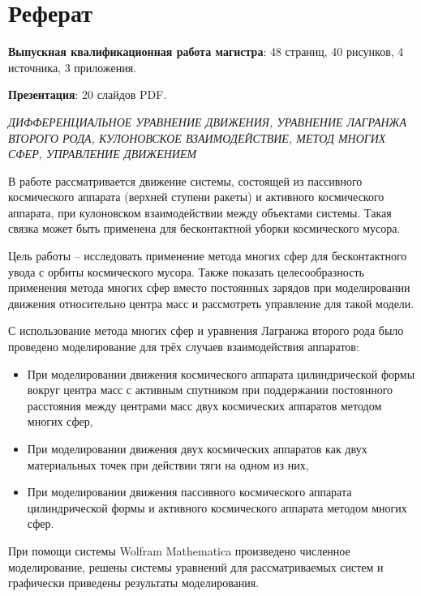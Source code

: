 \section*{Реферат}
\textbf{Выпускная квалификационная работа магистра}: 48 страниц, 40 рисунков, 4 источника, 3 приложения. 

\textbf{Презентация}: 20 слайдов PDF.

\hspace{1pt}

\textit{ДИФФЕРЕНЦИАЛЬНОЕ УРАВНЕНИЕ ДВИЖЕНИЯ, УРАВНЕНИЕ ЛАГРАНЖА ВТОРОГО РОДА, КУЛОНОВСКОЕ ВЗАИМОДЕЙСТВИЕ, МЕТОД МНОГИХ СФЕР, УПРАВЛЕНИЕ ДВИЖЕНИЕМ}

\hspace{1pt}

В работе рассматривается движение системы, состоящей из пассивного космического аппарата (верхней ступени ракеты) и активного космического аппарата, при кулоновском взаимодействии между объектами системы.
Такая связка может быть применена для бесконтактной уборки космического мусора.

Цель работы – исследовать применение метода многих сфер  для бесконтактного увода с орбиты космического мусора.
Также показать целесообразность применения метода многих сфер вместо постоянных зарядов при моделировании движения относительно центра масс и рассмотреть управление для такой модели.

С использование метода многих сфер и уравнения Лагранжа второго рода было проведено моделирование для трёх случаев взаимодействия аппаратов:
\begin{itemize}
	\item При моделировании движения космического аппарата цилиндрической формы вокруг центра масс с активным спутником при поддержании постоянного расстояния между центрами масс двух космических аппаратов методом многих сфер,
	\item При моделировании движения двух космических аппаратов как двух материальных точек при действии тяги на одном из них,
	\item При моделировании движения пассивного космического аппарата цилиндрической формы и активного космического аппарата методом многих сфер.
\end{itemize}
При помощи системы Wolfram Mathematica произведено численное моделирование, решены системы уравнений для рассматриваемых систем и графически приведены результаты моделирования.